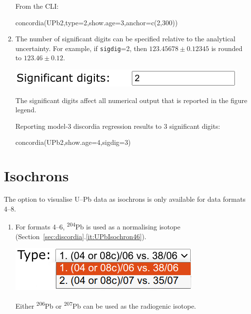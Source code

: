 \begin{refsection}
\begin{enumerate}
From the CLI:
\begin{console}
concordia(UPb2,type=2,show.age=3,anchor=c(2,300))
\end{console}

\item The number of significant digits can be specified relative to
  the analytical uncertainty. For example, if \texttt{sigdig}=2, then
  $123.45678 \pm 0.12345$ is rounded to $123.46 \pm 0.12$.

\noindent\begin{minipage}[t]{.4\linewidth}
\strut\vspace*{-\baselineskip}\newline
\includegraphics[width=\linewidth]{../figures/sigdig.png}
\end{minipage}
\begin{minipage}[t]{.6\linewidth}
  The significant digits affect all numerical output that is reported
  in the figure legend.
\end{minipage}

Reporting model-3 discordia regression results to 3 significant
digits:
\begin{console}
concordia(UPb2,show.age=4,sigdig=3)
\end{console}

\end{enumerate}

\section{Isochrons} \label{sec:UPb-isochron-R}

The option to visualise U--Pb data as isochrons is only available for
data formats 4--8.

\begin{enumerate}

  \item For formats 4--6, \textsuperscript{204}Pb is used as a
    normalising isotope
    (Section~\ref{sec:discordia}.\ref{it:UPbIsochron46}).

\noindent\begin{minipage}[t]{.3\linewidth}
\strut\vspace*{-\baselineskip}\newline
\includegraphics[width=\linewidth]{../figures/UPbIsochron.png}
\end{minipage}
\begin{minipage}[t]{.7\linewidth}
Either \textsuperscript{206}Pb or \textsuperscript{207}Pb can be used
as the radiogenic isotope.
\end{minipage}


\end{enumerate}
\end{refsection}
